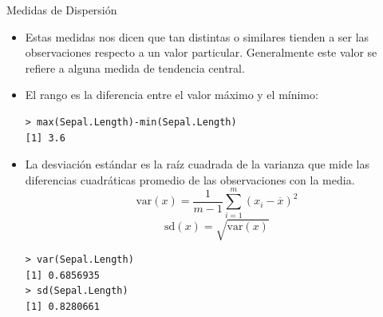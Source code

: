 \documentclass[handout]{beamer}
\begin{document}
\begin{frame}[fragile]{Medidas de Dispersión}
\scriptsize{ 
\begin{itemize}
 \item Estas medidas nos dicen que tan distintas o similares tienden a ser las observaciones respecto a un valor particular. Generalmente este valor se refiere a alguna medida de tendencia central.
 \item El rango es la diferencia entre el valor máximo y el mínimo:
 \begin{verbatim}
> max(Sepal.Length)-min(Sepal.Length)
[1] 3.6
 \end{verbatim}
 \item La desviación estándar es la raíz cuadrada de la varianza que mide las diferencias cuadráticas promedio de las observaciones con la media. 
 \begin{displaymath}
  \text{var}(x)=\frac{1}{m-1}\sum_{i=1}^{m}(x_{i} - \overline{x} )^2
 \end{displaymath}
 \begin{displaymath}
  \text{sd}(x)=\sqrt{\text{var}(x)}
 \end{displaymath}

\begin{verbatim}
> var(Sepal.Length)
[1] 0.6856935
> sd(Sepal.Length)
[1] 0.8280661 
\end{verbatim}



\end{itemize}
 
 
 
} 
\end{frame}
\end{document}
